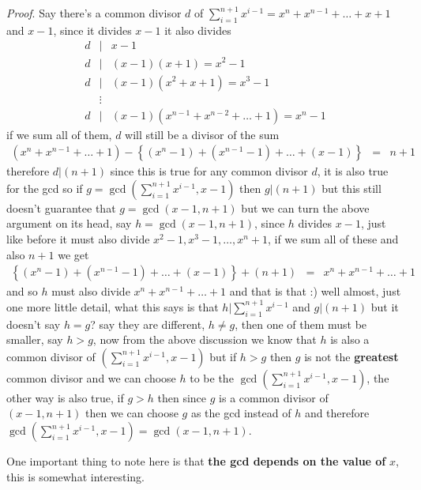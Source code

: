 \documentclass[aps,preprint,preprintnumbers,nofootinbib,showpacs,prd]{revtex4-1}
\newcommand{\nbea}{\begin{eqnarray*}}
\newcommand{\neea}{\end{eqnarray*}}
\begin{document}
{\it Proof}. Say there's a common divisor $d$ of $\sum_{i=1}^{n+1} x^{i-1} = x^n + x^{n-1} + \ldots + x + 1 $ and $x-1$, since it divides $x-1$ it also divides
%
\nbea
d &|& x - 1 \\
d &|& (x-1)(x+1) = x^2 - 1 \\
d &|& (x-1)(x^2 + x + 1) = x^3 - 1 \\
& \vdots & \\
d &|& (x-1)(x^{n-1} + x^{n-2} + \ldots + 1) = x^n - 1
\neea
%
if we sum all of them, $d$ will still be a divisor of the sum
%
\nbea
\left (x^n + x^{n-1} + \ldots + 1\right ) - \left \{ (x^n-1) + (x^{n-1}-1) + \ldots + (x-1)\right\} & = & n + 1
\neea
%
therefore $d|(n+1)$ since this is true for any common divisor $d$, it is also true for the gcd so if $g=\gcd\left(\sum_{i=1}^{n+1} x^{i-1}, x-1\right)$ then $g|(n+1)$ but this still doesn't guarantee that $g=\gcd(x-1,n+1)$ but we can turn the above argument on its head, say $h = \gcd(x-1,n+1)$, since $h$ divides $x-1$, just like before it must also divide $x^2-1,x^3-1,\dots,x^n+1$, if we sum all of these and also $n+1$ we get
%
\nbea
\left \{ (x^n-1) + (x^{n-1}-1) + \ldots + (x-1)\right\} + (n+1) & = & x^n + x^{n-1} + \ldots + 1
\neea
%
and so $h$ must also divide $x^n + x^{n-1} + \ldots + 1$ and that is that :) well almost, just one more little detail, what this says is that $h|\sum_{i=1}^{n+1} x^{i-1}$ and $g|(n+1)$ but it doesn't say $h=g$? say they are different, $h\neq g$, then one of them must be smaller, say $h > g$, now from the above discussion we know that $h$ is also a common divisor of $(\sum_{i=1}^{n+1} x^{i-1}, x-1)$ but if $h>g$ then $g$ is not the {\bf greatest} common divisor and we can choose $h$ to be the $\gcd(\sum_{i=1}^{n+1} x^{i-1}, x-1)$, the other way is also true, if $g > h$ then since $g$ is a common divisor of $(x-1,n+1)$ then we can choose $g$ as the gcd instead of $h$ and therefore $\gcd(\sum_{i=1}^{n+1} x^{i-1}, x-1)=\gcd(x-1,n+1)$.

One important thing to note here is that {\bf the gcd depends on the value of} $x$, this is somewhat interesting.
\end{document}
